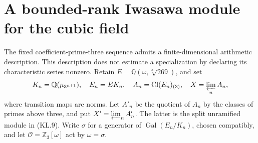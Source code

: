 \section{A bounded-rank Iwasawa module for the cubic field}
\label{sec:cubic-iwasawa-tower}

The fixed coefficient-prime-three sequence admits a finite-dimensional
arithmetic description.  This description does not estimate a
specialization by declaring its characteristic series nonzero.
Retain $E=\mathbb Q(\omega,\sqrt[3]{269})$, and set
\[
 K_n=\mathbb Q(\mu_{3^{n+1}}),\quad E_n=EK_n,\quad
 A_n=\operatorname{Cl}(E_n)_{(3)},\quad
 X=\varprojlim_n A_n,
\]
where transition maps are norms.  Let $A'_n$ be the quotient of $A_n$
by the classes of primes above three, and put
$X'=\varprojlim_n A'_n$.  The latter is the split unramified module
in (KL.9).  Write $\sigma$ for a generator of
$\operatorname{Gal}(E_n/K_n)$, chosen compatibly, and let
$\mathcal O=\mathbb Z_3[\omega]$ act by $\omega=\sigma$.

